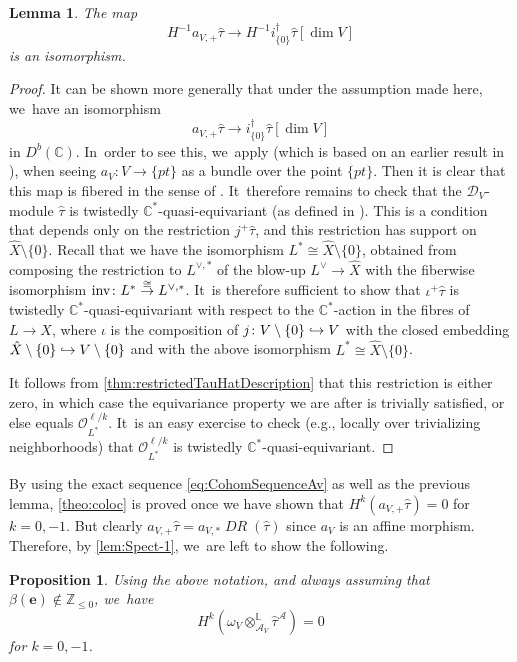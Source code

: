 \documentclass[JEP,XML,SOM,Unicode,published]{cedram}
\let\mathds\mathbb
\newcommand\hto{\mathrel{\lhook\joinrel\to}}
\newcommand{\bme}{{\boldsymbol{e}}}
\newtheorem{prop}[thm]{Proposition}
\newtheorem{lem}[thm]{Lemma}
\newcommand{\dC}{{\mathds C}}\let\C\dC
\newcommand{\dZ}{{\mathds Z}}\let\mbz\dZ\let\Z\dZ
\newcommand{\dL}{{\mathbb L}}
\newcommand{\cA}{\mathscr{A}}
\newcommand{\cD}{\mathscr{D}}
\newcommand{\cO}{\mathcal{O}}\let\O\cO
\DeclareMathOperator{\DR}{\mathit{DR}}
\begin{document}
\begin{lem}
The map
\[
H^{-1} a_{V,+} \hat\tau
\to H^{-1} i_{\{0\}}^\dag \hat\tau[\dim V]
\]
is an isomorphism.
\end{lem}

\begin{proof}
It can be shown more generally that under the assumption made here, we~have an isomorphism
\[
a_{V,+} \hat\tau
\to i_{\{0\}}^\dag \hat\tau[\dim V]
\]
in $D^b(\dC)$. In~order to see this, we~apply \cite[Lem.\,4.4]{AviDualProjRestrGKZ} (which is based on an earlier result in \cite[Lem.\,3.3]{ReichWalth-Duco}),
when seeing $a_V \colon V\to\{pt\}$ as a bundle over the point $\{pt\}$. Then it is clear that this map is fibered in the sense of \cite[Def.\,4.1]{AviDualProjRestrGKZ}. It~therefore remains to check that the $\cD_V$\nobreakdash-mod\-ule $\hat\tau$ is twistedly $\dC^*$-quasi-equivariant (as defined in \cite[Def.\,4.2]{AviDualProjRestrGKZ}). This is a condition that depends only on the restriction
$j^+\hat\tau$, and this restriction has support on $\hat{X}\setminus \{0\}$.
Recall that we have the isomorphism $L^* \cong \hat{X}\setminus\{0\}$, obtained from composing the restriction to $L^{\vee,*}$ of the blow-up $L^\vee \to \hat{X}$ with the fiberwise isomorphism $\textup{inv} \colon L^*\stackrel{\cong}{\to} L^{\vee,*}$. It~is therefore sufficient
to show that $\iota^+\hat{\tau}$ is
twistedly $\dC^*$-quasi-equivariant with respect to the
$\dC^*$-action in the fibres of $L\to X$, where $\iota$ is the composition of $j \colon V\setminus \{0\}\hto V$ with the closed embedding $\hat{X}\setminus\{0\}\hto V\setminus\{0\}$ and with the above isomorphism $L^{*}\cong \hat{X}\setminus\{0\}$.

It follows from \cref{thm:restrictedTauHatDescription} that this restriction is either zero, in which case the equivariance property we are after is trivially satisfied, or else equals $\cO_{L^*}^{\ell/k}$. It~is an easy exercise to check (e.g., locally over trivializing neighborhoods) that $\cO_{L^*}^{\ell/k}$ is
twistedly $\dC^*$-quasi-equivariant.
\end{proof}

By using the exact sequence \eqref{eq:CohomSequenceAv} as well as the previous lemma, \cref{theo:coloc} is proved once we have shown that $H^k(a_{V,+}\hat\tau)=0$ for $k=0,-1$. But clearly $a_{V,+}\hat\tau = a_{V,*}\DR(\hat\tau)$ since $a_V$ is an affine morphism. Therefore, by \cref{lem:Spect-1}, we~are left to show the following.

\begin{prop}\label{prop:VanishCohomA}
Using the above notation, and always assuming that
$\beta(\bme)\notin \dZ_{\leq 0}$, we~have
\[
H^k(\omega_V\otimes^\dL_{\cA_V}\hat{\tau}^\cA)=0
\]
for $k=0,-1$.
\end{prop}
\end{document}
